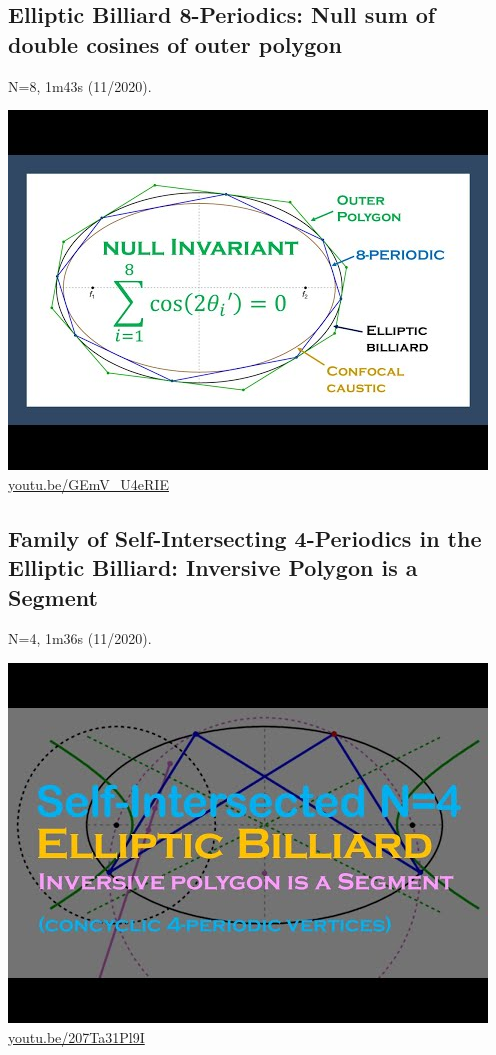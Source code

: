 \documentclass[12pt]{amsart}
\begin{document}
\subsection{Elliptic Billiard 8-Periodics: Null sum of double cosines of outer polygon}
\label{vid:GEmV_U4eRIE}
\noindent N=8, 1m43s (11/2020). 
\begin{center}\includegraphics[width=.5\textwidth]{pics/GEmV_U4eRIE.jpg} \\ 
\href{https://youtu.be/GEmV_U4eRIE}{\url{youtu.be/GEmV\_U4eRIE}}\end{center}
% 

\subsection{Family of Self-Intersecting 4-Periodics in the Elliptic Billiard: Inversive Polygon is a Segment}
\label{vid:207Ta31Pl9I}
\noindent N=4, 1m36s (11/2020). 
\begin{center}\includegraphics[width=.5\textwidth]{pics/207Ta31Pl9I.jpg} \\ 
\href{https://youtu.be/207Ta31Pl9I}{\url{youtu.be/207Ta31Pl9I}}\end{center}
% 
\end{document}
